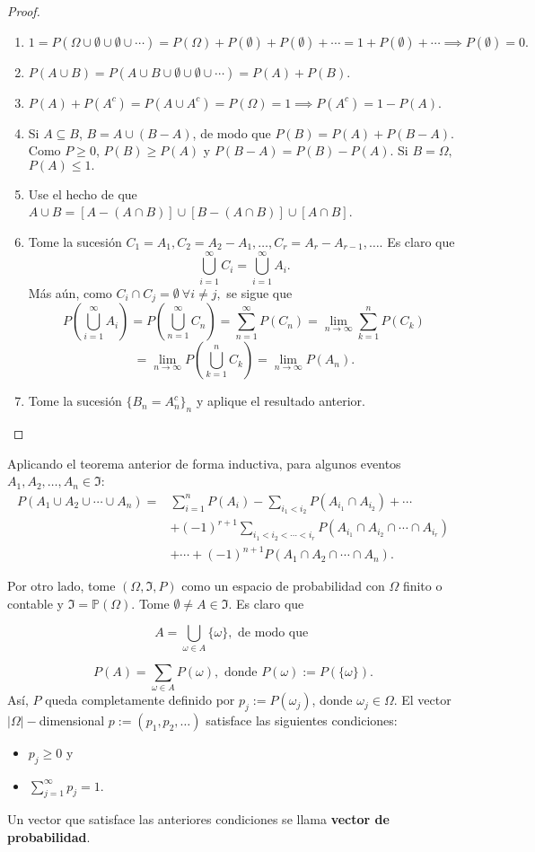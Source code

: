 	\begin{proof}
		\begin{enumerate}
			\item $1=P(\Omega\cup\emptyset\cup\emptyset\cup\cdots)=P(\Omega)+P(\emptyset)+P(\emptyset)+\cdots=1+P(\emptyset)+\cdots \implies P(\emptyset)=0.$
			\item $P(A\cup B)=P(A\cup B\cup\emptyset\cup\emptyset\cup\cdots)=P(A)+P(B).$
			\item $P(A)+P(A^c)=P(A\cup A^c)=P(\Omega)=1\implies P(A^c)=1-P(A).$
			\item Si $A\subseteq B$, $B=A\cup(B-A)$, de modo que $P(B)=P(A)+P(B-A).$ Como $P\geq0$, $P(B)\geq P(A)$ y $P(B-A)=P(B)-P(A).$ Si $B=\Omega,$ $P(A)\leq1.$
			\item Use el hecho de que $A\cup B=[A-(A\cap B)]\cup[B-(A\cap B)]\cup[A\cap B]$.			
			\item Tome la sucesión $C_1=A_1,C_2=A_2-A_1,\dots,C_r=A_r-A_{r-1},\dots$. Es claro que
			$$\bigcup_{i=1}^\infty C_i=\bigcup_{i=1}^\infty A_i.$$
			Más aún, como $C_i\cap C_j=\emptyset\ \forall i\neq j,$ se sigue que
			$$P\left(\bigcup_{i=1}^\infty A_i\right)=P\left(\bigcup_{n=1}^\infty C_n\right)=\sum_{n=1}^\infty P(C_n)=\lim_{n\rightarrow\infty} \sum_{k=1}^n P(C_k)$$ $$=\lim_{n\rightarrow\infty}P\left(\bigcup_{k=1}^n C_k\right)=\lim_{n\rightarrow\infty}P\left(A_n\right).$$
			\item Tome la sucesión $\{B_n=A_n^c\}_n$ y aplique el resultado anterior.
		\end{enumerate}
	\end{proof}
Aplicando el teorema anterior de forma inductiva, para algunos eventos $A_1,A_2,\dots,A_n\in\Im$:
	\begin{align*}
	P(A_1\cup A_2\cup \cdots\cup A_n)=&\sum_{i=1}^n P(A_i)-\sum_{i_1<i_2}P(A_{i_{1}}\cap A_{i_{2}})+\cdots \\    
			& +(-1)^{r+1}\sum_{i_1<i_2<	\cdots<i_r}P(A_{i_1}\cap A_{i_2}\cap\cdots\cap A_{i_r})\\
			&+\cdots+(-1)^{n+1}P(A_1\cap A_2\cap \cdots\cap A_n).
	\end{align*}
	
	Por otro lado, tome $(\Omega,\Im,P)$ como un espacio de probabilidad con $\Omega$ finito o contable y $\Im =\mathbb{P}(\Omega)$. Tome $\emptyset\neq A \in\Im.$ Es claro que
	
	$$A=\bigcup_{\omega\in A} \{\omega\}, \text{ de modo que }$$
	
	$$P(A)=\sum_{\omega\in A} P(\omega), \text{ donde } P(\omega):=P(\{\omega\}).$$
	Así, $P$ queda completamente definido por $p_j:=P(\omega_j)$, donde $\omega_j\in\Omega.$ El vector $|\Omega|-$dimensional $p:=(p_1,p_2,\dots)$ satisface las siguientes condiciones:
	\begin{itemize}
		\item $p_j\geq0$ y
		\item $\sum_{j=1}^\infty p_j=1.$
	\end{itemize}
	Un vector que satisface las anteriores condiciones se llama \textbf{vector de probabilidad}.
	
